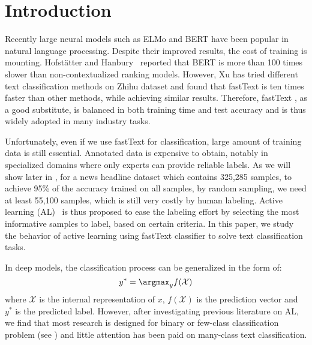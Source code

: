 \section{Introduction}
\label{sec:intro}

Recently large neural models such as ELMo \cite{peters2018deep} and BERT \cite{devlin2018bert} 
have been popular in natural language processing. 
Despite their improved results, the cost of training is mounting. 
Hofstätter and Hanbury~ 
reported that BERT is more than 100 times slower than non-contextualized ranking models. 
However, Xu  has tried different text classification methods 
on Zhihu dataset and found that fastText is ten times faster than other methods, 
while achieving similar results. Therefore, fastText \cite{joulin2016bag}, 
as a good substitute, is balanced in both training time and test accuracy 
and is thus widely adopted in many industry tasks. 

Unfortunately, even if we use fastText for classification, 
large amount of training data is still essential. Annotated data is expensive to obtain, 
notably in specialized domains where only experts can provide reliable labels. 
As we will show later in , for a news headline dataset which contains
325,285 samples, to achieve 95\% of the accuracy trained on all samples, by random sampling,
we need at least 55,100 samples, which is still very costly by human labeling.
Active learning (AL)~\cite{settles2009active} 
is thus proposed to ease the labeling effort
by selecting the most informative samples to label, based on certain criteria. 
In this paper, we study the behavior of active learning using
fastText classifier to solve text classification tasks. 

In deep models, the classification process can be generalized in the form of: 
\[y^* = \argmax_y f(\mathcal{X})\] 
where $\mathcal{X}$ is 
the internal representation of $x$, 
$f(\mathcal{X})$ is the prediction vector and $y^*$ is the predicted label. However, after investigating previous literature on AL, we find that most research is designed for binary or few-class classification problem (see ) and little attention has been paid on many-class text classification. 

